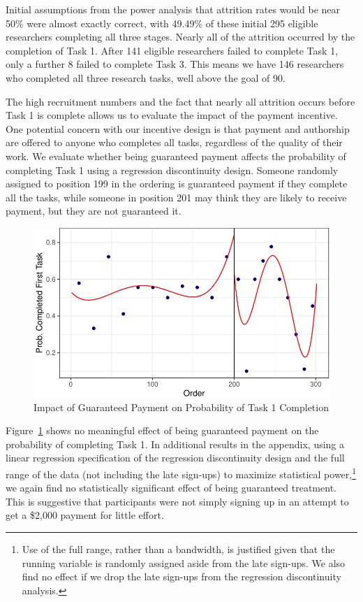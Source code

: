 \documentclass[
  letterpaper,
  DIV=11,
  numbers=noendperiod]{scrartcl}
\begin{document}
Initial assumptions from the power analysis that attrition rates would
be near 50\% were almost exactly correct, with 49.49\% of these initial
295 eligible researchers completing all three stages. Nearly all of the
attrition occurred by the completion of Task 1. After 141 eligible
researchers failed to complete Task 1, only a further 8 failed to
complete Task 3. This means we have 146 researchers who completed all
three research tasks, well above the goal of 90.

The high recruitment numbers and the fact that nearly all attrition
occurs before Task 1 is complete allows us to evaluate the impact of the
payment incentive. One potential concern with our incentive design is
that payment and authorship are offered to anyone who completes all
tasks, regardless of the quality of their work. We evaluate whether
being guaranteed payment affects the probability of completing Task 1
using a regression discontinuity design. Someone randomly assigned to
position 199 in the ordering is guaranteed payment if they complete all
the tasks, while someone in position 201 may think they are likely to
receive payment, but they are not guaranteed it.

\begin{figure}

{\centering \includegraphics{The-Sources-of-Researcher-Variation-in-Economics_files/figure-pdf/fig-rdd-1.pdf}

}

\caption{\label{fig-rdd}Impact of Guaranteed Payment on Probability of
Task 1 Completion}

\end{figure}

Figure~\ref{fig-rdd} shows no meaningful effect of being guaranteed
payment on the probability of completing Task 1. In additional results
in the appendix, using a linear regression specification of the
regression discontinuity design and the full range of the data (not
including the late sign-ups) to maximize statistical power,\footnote{Use
  of the full range, rather than a bandwidth, is justified given that
  the running variable is randomly assigned aside from the late
  sign-ups. We also find no effect if we drop the late sign-ups from the
  regression discontinuity analysis.} we again find no statistically
significant effect of being guaranteed treatment. This is suggestive
that participants were not simply signing up in an attempt to get a
\$2,000 payment for little effort.
\end{document}

